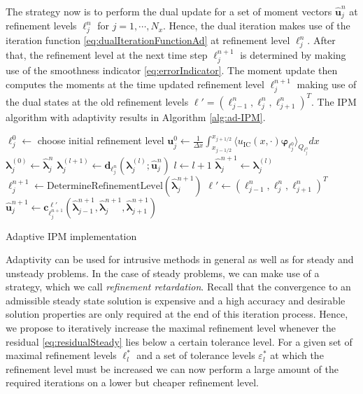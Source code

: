The strategy now is to perform the dual update for a set of moment vectors $\bm{\hat u}_j^n$ at refinement levels $\ell_j^n$ for $j = 1,\cdots,N_x$. Hence, the dual iteration makes use of the iteration function \eqref{eq:dualIterationFunctionAd} at refinement level $\ell_j^n$. After that, the refinement level at the next time step $\ell_j^{n+1}$ is determined by making use of the smoothness indicator \eqref{eq:errorIndicator}. The moment update then computes the moments at the time updated refinement level $\ell_j^{n+1}$ making use of the dual states at the old refinement levels $\bm{\ell}' = (\ell_{j-1}^n,\ell_{j}^n,\ell_{j+1}^n)^T$. The IPM algorithm with adaptivity results in Algorithm \ref{alg:ad-IPM}.
\begin{algorithm}[H]
\begin{algorithmic}[1]
\State $\ell_j^0 \leftarrow$ choose initial refinement level
\State $\bm{u}_j^0 \leftarrow \frac{1}{\Delta x} \int_{x_{j-1/ 2}}^{x_{j+1/ 2}} \langle u_{\text{IC}}(x, \cdot) \bm{\varphi}_{\ell_j^0} \rangle_{Q_{\ell_j^0}} dx$
\EndFor
{}
\State $\bm{\lambda}_j^{(0)} \leftarrow \bm{\hat \lambda}_j^{n}$
\State $\bm{\lambda}_j^{(l+1)} \leftarrow \bm{d}_{\ell_j^n}(\bm{\lambda}_{j}^{(l)};\bm{\hat u}_j^{n})$
\State $l \leftarrow l+1$
\EndWhile
\State $\bm{\hat \lambda}_j^{n+1} \leftarrow \bm{\lambda}_j^{(l)}$
\State $\ell_j^{n+1}\leftarrow \text{DetermineRefinementLevel}\left(\bm{\hat \lambda}_j^{n+1}\right)$
\EndFor
{}
\State $\bm\ell' \leftarrow (\ell_{j-1}^n,\ell_{j}^n,\ell_{j+1}^n)^T$
\State $\bm{\hat u}_j^{n+1} \leftarrow \bm{c}_{\ell_j^{n+1}}^{\bm\ell'}(\bm{\hat \lambda}_{j-1}^{n+1},\bm{\hat \lambda}_j^{n+1},\bm{\hat \lambda}_{j+1}^{n+1})$
\EndFor
\EndFor
\end{algorithmic}
\caption{Adaptive IPM implementation}
\label{alg:ad-IPM}
\end{algorithm}
Adaptivity can be used for intrusive methods in general as well as for steady and unsteady problems. In the case of steady problems, we can make use of a strategy, which we call \textit{refinement retardation}. Recall that the convergence to an admissible steady state solution is expensive and a high accuracy and desirable solution properties are only required at the end of this iteration process. Hence, we propose to iteratively increase the maximal refinement level whenever the residual \eqref{eq:residualSteady} lies below a certain tolerance level. For a given set of maximal refinement levels $\ell_l^*$ and a set of tolerance levels $\varepsilon_l^*$ at which the refinement level must be increased we can now perform a large amount of the required iterations on a lower but cheaper refinement level.
